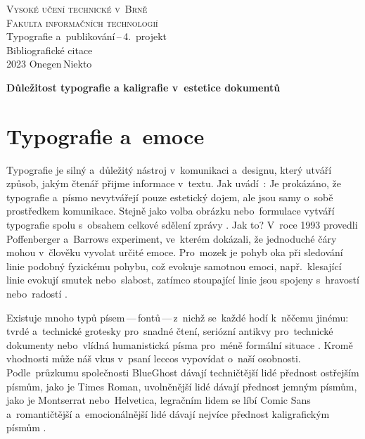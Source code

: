 \documentclass[a4paper, 11pt]{article}
\begin{document}
\begin{titlepage}
	\begin{center}
		{\Huge \textsc{Vysoké učení technické v~Brně}\\}
		{\huge \textsc{Fakulta informačních technologií}\\}
		{\LARGE Typografie a~publikování\,--\,4.\ projekt\\}
		{\Huge Bibliografické citace\\}
		{\Large 2023 \hfill Onegen\,Niekto}
	\end{center}
\end{titlepage}

\begin{center}
	\Large
	\textbf{Důležitost typografie a kaligrafie v~estetice dokumentů}
	\bigskip
\end{center}
\section*{Typografie a~emoce}

Typografie je silný a~důležitý nástroj v~komunikaci a~designu, který utváří
způsob, jakým čtenář přijme informace v~textu.
Jak uvádí~\textcite{Koch:2012:EmotionIT}: 
Je prokázáno, že typografie a~písmo nevytvářejí pouze estetický dojem,
ale jsou samy o~sobě prostředkem komunikace. Stejně jako volba obrázku
nebo~formulace vytváří typografie spolu s~obsahem
celkové sdělení zprávy \parencite{Pilka:2019:CharakterPisma}. 
Jak to? V~roce 1993 provedli Poffenberger a~Barrows experiment,
ve~kterém dokázali, že jednoduché čáry mohou v~člověku vyvolat určité emoce.
Pro~mozek je pohyb oka při sledování linie podobný fyzickému pohybu,
což evokuje samotnou emoci, např.~klesající linie evokují smutek nebo~slabost,
zatímco stoupající linie jsou spojeny s~hravostí nebo~radostí
\parencite{Sladovnikova:2021:EmoceTextu}.

Existuje mnoho typů písem\,---\,fontů\,---\,z~nichž se~každé hodí k~něčemu
jinému: tvrdé a~technické grotesky pro~snadné čtení, seriózní antikvy
pro~technické dokumenty nebo~vlídná humanistická písma pro~méně formální situace
\parencite{Samara:2010:ZakladyDesignu}.
Kromě vhodnosti může náš vkus v~psaní leccos vypovídat o~naší osobnosti.
Podle~průzkumu společnosti BlueGhost dávají techničtější lidé přednost ostřejším
písmům, jako je Times Roman, uvolněnější lidé dávají přednost jemným písmům,
jako je Montserrat nebo~Helvetica, legračním lidem se líbí Comic Sans
a~romantičtější a~emocionálnější lidé dávají nejvíce přednost kaligrafickým
písmům \parencite{Pilka:2019:CharakterPisma}.
\end{document}

